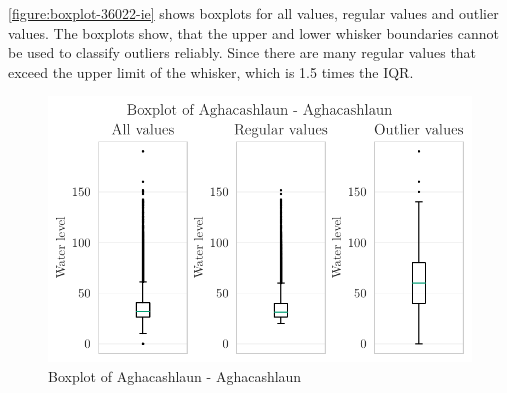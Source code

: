 \autoref{figure:boxplot-36022-ie} shows boxplots for all values, regular values and outlier values. The boxplots show, that the upper and lower whisker boundaries cannot be used to classify outliers reliably. Since there are many regular values that exceed the upper limit of the whisker, which is 1.5 times the \ac{IQR}.
\begin{figure}[htp]
    \centering
    \includegraphics{./plots/pdfs/36022-ie/boxplot_36022-ie.pdf}
    \caption{Boxplot of Aghacashlaun - Aghacashlaun}
    \label{figure:boxplot-36022-ie}
\end{figure}


